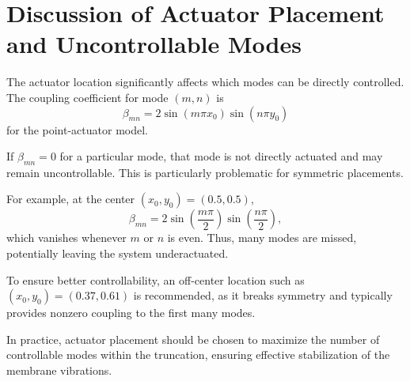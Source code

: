 \documentclass[11pt]{article}
\begin{document}
\section{Discussion of Actuator Placement and Uncontrollable Modes}

The actuator location significantly affects which modes can be directly controlled. The coupling coefficient for mode $(m,n)$ is
\[
\beta_{mn} = 2 \sin(m\pi x_0) \sin(n\pi y_0)
\]
for the point-actuator model.

If $\beta_{mn} = 0$ for a particular mode, that mode is not directly actuated and may remain uncontrollable. This is particularly problematic for symmetric placements.

For example, at the center $(x_0, y_0) = (0.5, 0.5)$,
\[
\beta_{mn} = 2 \sin\left(\frac{m\pi}{2}\right) \sin\left(\frac{n\pi}{2}\right),
\]
which vanishes whenever $m$ or $n$ is even. Thus, many modes are missed, potentially leaving the system underactuated.

To ensure better controllability, an off-center location such as $(x_0, y_0) = (0.37, 0.61)$ is recommended, as it breaks symmetry and typically provides nonzero coupling to the first many modes.

In practice, actuator placement should be chosen to maximize the number of controllable modes within the truncation, ensuring effective stabilization of the membrane vibrations.
\end{document}
